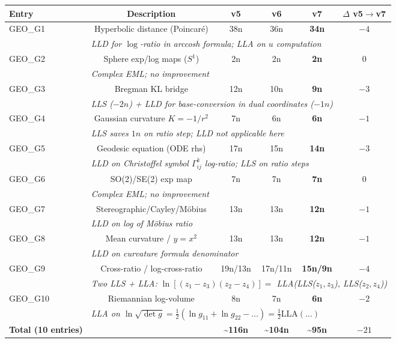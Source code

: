 \documentclass[11pt]{article}
\newcommand{\imp}[1]{\textcolor{imp}{\textbf{#1}}}
\begin{document}
\begin{longtable}{lccccc}
\toprule
Entry & Description & v5 & v6 & v7 & $\Delta$ v5$\to$v7 \\
\midrule
GEO\_G1 & Hyperbolic distance (Poincaré) & 38n & 36n & \imp{34n} & $-4$ \\
& \multicolumn{5}{l}{\small\textit{LLD for $\log$-ratio in arccosh formula; LLA on $u$ computation}} \\
GEO\_G2 & Sphere exp/log maps ($S^1$) & 2n & 2n & \imp{2n} & 0 \\
& \multicolumn{5}{l}{\small\textit{Complex EML; no improvement}} \\
GEO\_G3 & Bregman KL bridge & 12n & 10n & \imp{9n} & $-3$ \\
& \multicolumn{5}{l}{\small\textit{LLS ($-2n$) + LLD for base-conversion in dual coordinates ($-1n$)}} \\
GEO\_G4 & Gaussian curvature $K=-1/r^2$ & 7n & 6n & \imp{6n} & $-1$ \\
& \multicolumn{5}{l}{\small\textit{LLS saves $1n$ on ratio step; LLD not applicable here}} \\
GEO\_G5 & Geodesic equation (ODE rhs) & 17n & 15n & \imp{14n} & $-3$ \\
& \multicolumn{5}{l}{\small\textit{LLD on Christoffel symbol $\Gamma^k_{ij}$ log-ratio; LLS on ratio steps}} \\
GEO\_G6 & SO(2)/SE(2) exp map & 7n & 7n & \imp{7n} & 0 \\
& \multicolumn{5}{l}{\small\textit{Complex EML; no improvement}} \\
GEO\_G7 & Stereographic/Cayley/Möbius & 13n & 13n & \imp{12n} & $-1$ \\
& \multicolumn{5}{l}{\small\textit{LLD on log of Möbius ratio}} \\
GEO\_G8 & Mean curvature / $y=x^2$ & 13n & 13n & \imp{12n} & $-1$ \\
& \multicolumn{5}{l}{\small\textit{LLD on curvature formula denominator}} \\
GEO\_G9 & Cross-ratio / log-cross-ratio & 19n/13n & 17n/11n & \imp{15n/9n} & $-4$ \\
& \multicolumn{5}{l}{\small\textit{Two LLS + LLA: $\ln[(z_1-z_3)(z_2-z_4)] = $ LLA(LLS($z_1,z_3$), LLS($z_2,z_4$))}} \\
GEO\_G10 & Riemannian log-volume & 8n & 7n & \imp{6n} & $-2$ \\
& \multicolumn{5}{l}{\small\textit{LLA on $\ln\sqrt{\det g} = \frac{1}{2}(\ln g_{11} + \ln g_{22} - \ldots) = \frac{1}{2}\mathrm{LLA}(\ldots)$}} \\
\midrule
\textbf{Total (10 entries)} & & \textbf{\textasciitilde116n} & \textbf{\textasciitilde104n} & \imp{\textbf{\textasciitilde95n}} & $-21$ \\
\bottomrule
\end{longtable}
\end{document}
